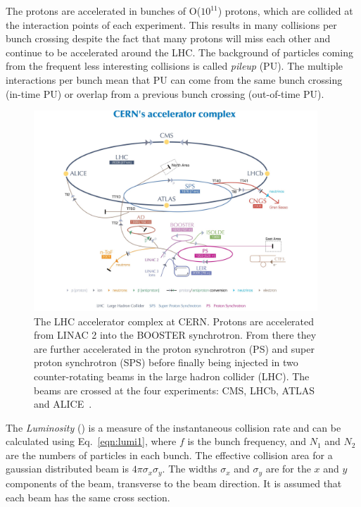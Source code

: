 The protons are accelerated in bunches of O($10^{11}$) protons, which are collided at the interaction points of each experiment. This results in many collisions per bunch crossing despite the fact that many protons will miss each other and continue to be accelerated around the LHC. The background of particles coming from the frequent less interesting collisions is called \emph{pileup} (PU). The multiple interactions per bunch mean that PU can come from the same bunch crossing (in-time PU) or overlap from a previous bunch crossing (out-of-time PU).

\begin{figure}[ht!]
\centering
    \includegraphics[width=0.95\textwidth]{images/LHCacc.jpg}
    \caption{The LHC accelerator complex at CERN. Protons are accelerated from LINAC 2 into the BOOSTER synchrotron. From there they are further accelerated in the proton synchrotron (PS) and super proton synchrotron (SPS) before finally being injected in two counter-rotating beams in the large hadron collider (LHC). The beams are crossed at the four experiments: CMS, LHCb, ATLAS and ALICE~\cite{Marcastel:1621583}.}
    \label{fig:LHC acc}
\end{figure}


The \emph{Luminosity} (\lumi) is a measure of the instantaneous collision rate and can be calculated using Eq.~\ref{eqn:lumi1}, where $f$ is the bunch frequency, and $N_1$ and $N_2$ are the numbers of particles in each bunch. The effective collision area for a gaussian distributed beam is $4\pi\sigma_{x}\sigma_{y}$. The widths $\sigma_{x}$ and $\sigma_{y}$ are for the $x$ and $y$ components of the beam, transverse to the beam direction. It is assumed that each beam has the same cross section.

